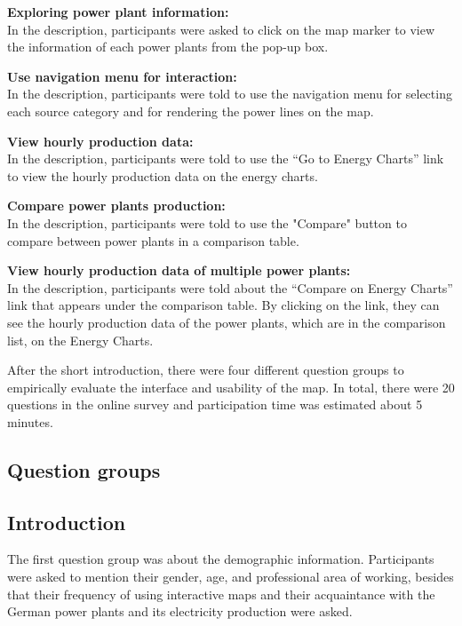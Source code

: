 \textbf{Exploring power plant information:}\\
In the description, participants were asked to click on the map marker to view the information of each power plants from the pop-up box. 

\textbf{Use navigation menu for interaction:}\\
In the description, participants were told to use the navigation menu for selecting each source category and for rendering the power lines on the map.

\textbf{View hourly production data:}\\
In the description, participants were told to use the “Go to Energy Charts” link to view the hourly production data on the energy charts.

\textbf{Compare power plants production:}\\
In the description, participants were told to use the "Compare" button to  compare between power plants in a comparison table.

\textbf{View hourly production data of multiple power plants:}\\
In the description, participants were told about the “Compare on Energy Charts” link that appears under the comparison table. By clicking on the link, they can see the hourly production data of the power plants, which are in the comparison list, on the Energy Charts. 

After the short introduction, there were four different question groups to empirically evaluate the interface and usability of the map. In total, there were 20 questions in the online survey and participation time was estimated about 5 minutes.  

\subsection{Question groups}
\label{sssec:quesGroup} 

\subsection*{Introduction}
\label{sssec:intro}

The first question group was about the demographic information. Participants were asked to mention their gender, age, and professional area of working, besides that their frequency of using interactive maps and their acquaintance with the German power plants and its electricity production were asked. 

